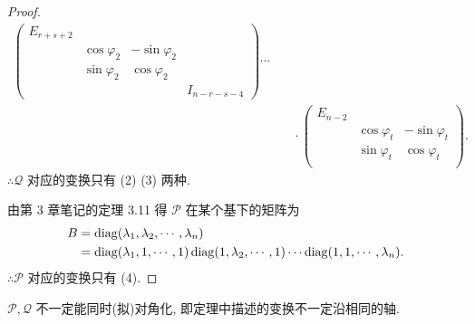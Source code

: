\documentclass{ctexart}
\begin{document}
\begin{proof}
\begin{align*}
\begin{pmatrix}
            E_{r+s+2} \\
            & \cos\varphi_2 & -\sin\varphi_2 \\
            & \sin\varphi_2 & \cos\varphi_2 \\
            &&& I_{n-r-s-4}
        \end{pmatrix}\cdots \\
        & \quad\cdot\begin{pmatrix}
            E_{n-2} \\
            & \cos\varphi_t & -\sin\varphi_t \\
            & \sin\varphi_t & \cos\varphi_t \\
        \end{pmatrix}.
    \end{align*}
    $\therefore\mathcal{Q}$ 对应的变换只有 (2) (3) 两种.

    由第 3 章笔记的定理 3.11 得 $\mathcal{P}$ 在某个基下的矩阵为
    \begin{align*}
        B & =\operatorname{diag} (\lambda_1,\lambda_2,\cdots,\lambda_n) \\
        & =\operatorname{diag} (\lambda_1,1,\cdots,1)\operatorname{diag} (1,\lambda_2,\cdots,1)\cdots\operatorname{diag} (1,1,\cdots,\lambda_n).
    \end{align*}
    $\therefore\mathcal{P}$ 对应的变换只有 (4).
\end{proof}
\begin{note}
    $\mathcal{P},\mathcal{Q}$ 不一定能同时(拟)对角化, 即定理中描述的变换不一定沿相同的轴.
\end{note}
\end{document}
